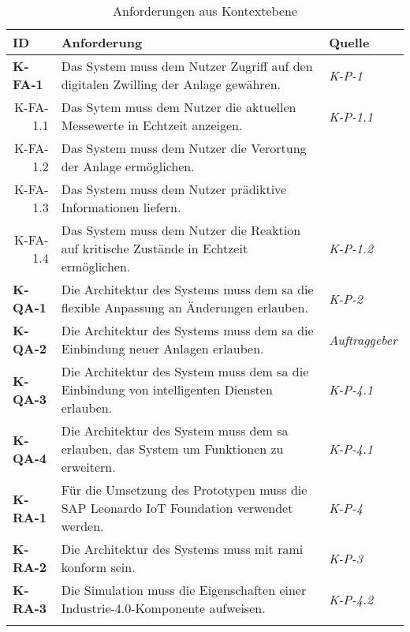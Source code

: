 \begin{table}[ht!]
  \begin{tabularx}{\textwidth}{@{}lXp{2cm}@{}}
      \toprule
      ID                & Anforderung & Quelle \\
      \midrule
      \textbf{K-FA-1}              &   Das System muss dem Nutzer Zugriff auf den digitalen Zwilling der Anlage gewähren.  & \textit{K-P-1}                \\
      \multicolumn{1}{r}{K-FA-1.1} &  Das Sytem muss dem Nutzer die aktuellen Messewerte in Echtzeit anzeigen.    & \textit{K-P-1.1}\\
      \multicolumn{1}{r}{K-FA-1.2} & Das System muss dem Nutzer die Verortung der Anlage ermöglichen. \\
      \multicolumn{1}{r}{K-FA-1.3} & Das System muss dem Nutzer prädiktive Informationen liefern.\\
      \multicolumn{1}{r}{K-FA-1.4} & Das System muss dem Nutzer die Reaktion auf kritische Zustände in Echtzeit ermöglichen.  & \textit{K-P-1.2}\\
      \textbf{K-QA-1}              & Die Architektur des Systems muss dem \ac{sa} die flexible Anpassung an Änderungen erlauben.     & \textit{K-P-2}                \\
      \textbf{K-QA-2}              & Die Architektur des Systems muss dem \ac{sa} die Einbindung neuer Anlagen erlauben.           & \textit{Auftraggeber}                \\
      \textbf{K-QA-3}              &  Die Architektur des System muss dem \ac{sa} die Einbindung von intelligenten Diensten erlauben.  & \textit{K-P-4.1} \\
      \textbf{K-QA-4}              &  Die Architektur des System muss dem \ac{sa} erlauben, das System um Funktionen zu erweitern.  & \textit{K-P-4.1} \\
      \textbf{K-RA-1}              & Für die Umsetzung des Prototypen muss die SAP Leonardo IoT Foundation verwendet werden.       & \textit{K-P-4} \\
      \textbf{K-RA-2}              & Die Architektur des Systems muss mit \ac{rami} konform sein.      & \textit{K-P-3} \\
      \textbf{K-RA-3}              & Die Simulation muss die Eigenschaften einer Industrie-4.0-Komponente aufweisen.      & \textit{K-P-4.2} \\
      \addlinespace
      \bottomrule
  \end{tabularx}
  \caption{Anforderungen aus Kontextebene}
  \label{kontext_anforderungen}
\end{table}

